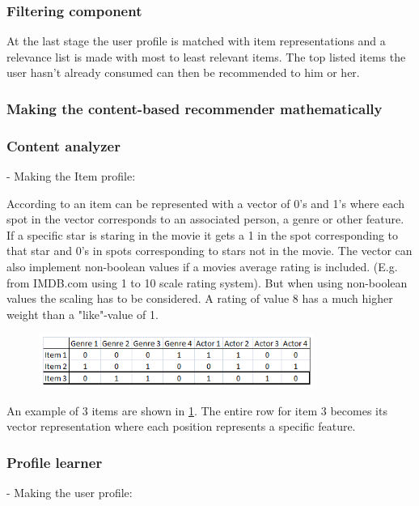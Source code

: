 \subsubsection{Filtering component}
At the last stage the user profile is matched with item representations and a relevance list is made with most to least relevant items. The top listed items the user hasn't already consumed can then be recommended to him or her.
 
\subsubsection{Making the content-based recommender mathematically}

\subsubsection{Content analyzer}
- Making the Item profile:
 
According to \cite{MoMDatasets} an item can be represented with a vector of 0's and 1's where each spot in the vector corresponds to an associated person, a genre or other feature. If a specific star is staring in the movie it gets a 1 in the spot corresponding to that star and 0's in spots corresponding to stars not in the movie. The vector can also implement non-boolean values if a movies average rating is included. (E.g. from IMDB.com using 1 to 10 scale rating system). But when using non-boolean values the scaling has to be considered. A rating of value 8 has a much higher weight than a "like"-value of 1.

\begin{figure}[H]
\centering
\includegraphics[width=0.8\textwidth]{Images/Vectorrepresentationitems.png}
\caption{}
\label{VrepItem}
\end{figure}

An example of 3 items are shown in \ref{VrepItem}. The entire row for item 3 becomes its vector representation where each position represents a specific feature.  
 
\subsubsection{Profile learner}
- Making the user profile:

